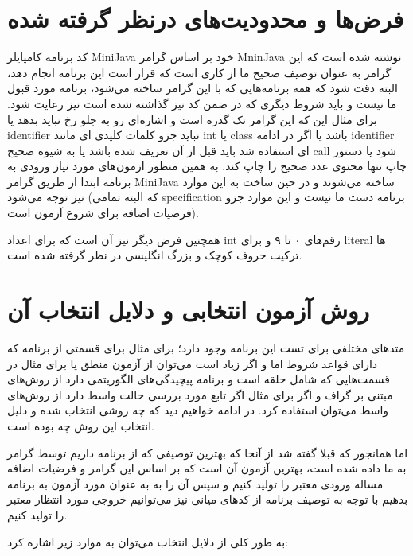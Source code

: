 \section{فرض‌ها و محدودیت‌های درنظر گرفته شده}\label{sec:limit}
کد برنامه کامپایلر MiniJava خود بر اساس گرامر MninJava نوشته شده است که این گرامر به عنوان توصیف صحیح ما از کاری است که قرار است این برنامه انجام دهد، البته دقت شود که همه برنامه‌هایی که با این گرامر ساخته می‌شود، برنامه مورد قبول ما نیست و باید شروط دیگری که در ضمن کد نیز گذاشته شده است نیز رعایت شود. 
برای مثال این که این گرامر تک گذره است و اشاره‌ای رو به جلو رخ نباید بدهد یا identifier نباید جزو کلمات کلیدی ای مانند int یا class باشد یا اگر در ادامه identifier ای استفاده شد باید قبل از آن تعریف شده باشد یا به شیوه صحیح call شود یا دستور چاپ تنها محتوی عدد صحیح را چاپ کند.
به همین منظور ازمون‌های مورد نیاز ورودی به برنامه ابتدا از طریق گرامر MiniJava ساخته می‌شوند و در حین ساخت به این موارد نیز توجه می‌شود (که البته تمامی specification برنامه دست ما نیست و این موارد جزو فرضیات اضافه برای شروع آزمون است).

همچنین فرض دیگر نیز آن است که  برای اعداد ‌int رقم‌های ۰ تا ۹ و برای literal ها ترکیب حروف کوچک و بزرگ انگلیسی در نظر گرفته شده است.


\section{روش آزمون انتخابی و دلایل انتخاب آن}\label{sec: method}

متدهای مختلفی برای تست این برنامه وجود دارد؛ برای مثال برای قسمتی از برنامه که دارای قواعد شروط اما و اگر زیاد است می‌توان از آزمون منطق یا برای مثال در قسمت‌هایی که شامل حلقه است و برنامه پیچیدگی‌های الگوریتمی دارد از روش‌های مبتنی بر گراف و اگر برای مثال اگر تابع مورد بررسی حالت واسط دارد از روش‌های واسط  می‌توان استفاده کرد.  
در ادامه خواهیم دید که چه روشی انتخاب شده و دلیل انتخاب این روش چه بوده است.

اما همانجور که قبلا گفته شد از آنجا که بهترین توصیفی که از برنامه داریم توسط گرامر به ما داده شده است، بهترین آزمون آن است که بر اساس این گرامر و فرضیات اضافه مساله ورودی معتبر را تولید کنیم و سپس آن را به به عنوان مورد آزمون به برنامه بدهیم با توجه به توصیف برنامه از کد‌های میانی نیز می‌توانیم خروجی مورد انتظار معتبر را تولید کنیم. 

به طور کلی از دلایل انتخاب می‌توان به موارد زیر اشاره کرد:


